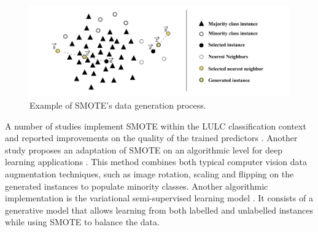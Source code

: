 \documentclass[parskip=full]{scrartcl}
\begin{document}
\begin{figure}[H]
	\centering
	\includegraphics[width=1\linewidth]{../analysis/smote_example}
	\caption{Example of SMOTE's data generation process.}
	\label{fig:smote_example}
\end{figure}

A number of studies implement SMOTE within the LULC classification context and
reported improvements on the quality of the trained predictors
\cite{Jozdani2019, Bogner2018}. Another study proposes an adaptation of SMOTE on an
algorithmic level for deep learning applications \cite{Zhu2020}. This
method combines both typical computer vision data augmentation techniques, such
as image rotation, scaling and flipping on the generated instances to populate
minority classes. Another algorithmic implementation is the variational
semi-supervised learning model \cite{Cenggoro2018}. It consists of a
generative model that allows learning from both labelled and unlabelled
instances while using SMOTE to balance the data.
\end{document}
